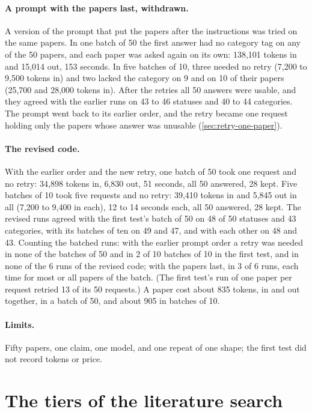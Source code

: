 \paragraph{A prompt with the papers last, withdrawn.}
A version of the prompt that put the papers after the instructions was
tried on the same papers.
In one batch of 50 the first answer had no category tag on any of the
50 papers, and each paper was asked again on its own: 138,101 tokens in
and 15,014 out, 153 seconds.
In five batches of 10, three needed no retry (7,200 to 9,500 tokens in)
and two lacked the category on 9 and on 10 of their papers (25,700 and
28,000 tokens in).
After the retries all 50 answers were usable, and they agreed with the
earlier runs on 43 to 46 statuses and 40 to 44 categories.
The prompt went back to its earlier order, and the retry became one
request holding only the papers whose answer was unusable
(\cref{sec:retry-one-paper}).

\paragraph{The revised code.}
With the earlier order and the new retry, one batch of 50 took one
request and no retry: 34,898 tokens in, 6,830 out, 51 seconds, all 50
answered, 28 kept.
Five batches of 10 took five requests and no retry: 39,410 tokens in and
5,845 out in all (7,200 to 9,400 in each), 12 to 14 seconds each, all 50
answered, 28 kept.
The revised runs agreed with the first test's batch of 50 on 48 of 50
statuses and 43 categories, with its batches of ten on 49 and 47, and
with each other on 48 and 43.
Counting the batched runs: with the earlier prompt order a retry was
needed in none of the batches of 50 and in 2 of 10 batches of 10 in the
first test, and in none of the 6 runs of the revised code; with the
papers last, in 3 of 6 runs, each time for most or all papers of the
batch.
(The first test's run of one paper per request retried 13 of its 50
requests.)
A paper cost about 835 tokens, in and out together, in a batch of 50, and
about 905 in batches of 10.

\paragraph{Limits.}
Fifty papers, one claim, one model, and one repeat of one shape; the
first test did not record tokens or price.

\section{The tiers of the literature search}
\label{sec:measured-tiers}

